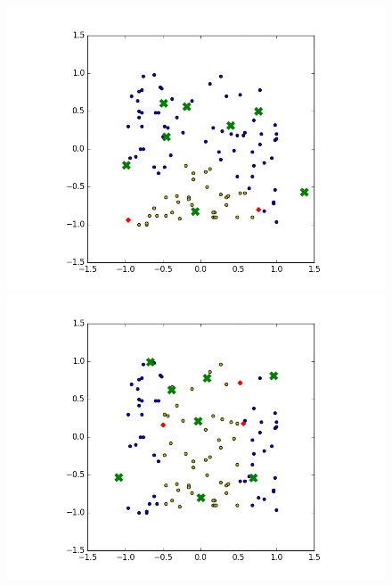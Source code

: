 \documentclass[notitlepage]{report}
\theoremstyle{definition}
\begin{document}
\begin{figure}[H]
  \centering
  \begin{minipage}[b]{0.4\textwidth}
    \includegraphics[width=\textwidth]{RBFN-01.png}
    \caption{}
  \end{minipage}
  \hfill
  \centering
  \begin{minipage}[b]{0.4\textwidth}
    \includegraphics[width=\textwidth]{RBFN-02.png}
    \caption{}
  \end{minipage}
  \hfill
  \centering
  \begin{minipage}[b]{0.4\textwidth}

\end{minipage}
\end{figure}
\end{document}
